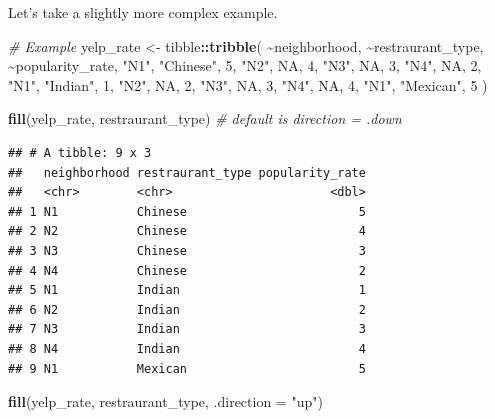 \documentclass[
]{book}
\newenvironment{Shaded}{\begin{snugshade}}{\end{snugshade}}
\newcommand{\AttributeTok}[1]{\textcolor[rgb]{0.13,0.29,0.53}{#1}}
\newcommand{\CommentTok}[1]{\textcolor[rgb]{0.56,0.35,0.01}{\textit{#1}}}
\newcommand{\ConstantTok}[1]{\textcolor[rgb]{0.56,0.35,0.01}{#1}}
\newcommand{\DecValTok}[1]{\textcolor[rgb]{0.00,0.00,0.81}{#1}}
\newcommand{\FunctionTok}[1]{\textcolor[rgb]{0.13,0.29,0.53}{\textbf{#1}}}
\newcommand{\NormalTok}[1]{#1}
\newcommand{\OtherTok}[1]{\textcolor[rgb]{0.56,0.35,0.01}{#1}}
\newcommand{\SpecialCharTok}[1]{\textcolor[rgb]{0.81,0.36,0.00}{\textbf{#1}}}
\newcommand{\StringTok}[1]{\textcolor[rgb]{0.31,0.60,0.02}{#1}}
\begin{document}
Let's take a slightly more complex example.

\begin{Shaded}
\begin{Highlighting}[]
\CommentTok{\# Example}
\NormalTok{yelp\_rate }\OtherTok{\textless{}{-}}\NormalTok{ tibble}\SpecialCharTok{::}\FunctionTok{tribble}\NormalTok{(}
  \SpecialCharTok{\textasciitilde{}}\NormalTok{neighborhood, }\SpecialCharTok{\textasciitilde{}}\NormalTok{restraurant\_type, }\SpecialCharTok{\textasciitilde{}}\NormalTok{popularity\_rate,}
  \StringTok{"N1"}\NormalTok{, }\StringTok{"Chinese"}\NormalTok{, }\DecValTok{5}\NormalTok{,}
  \StringTok{"N2"}\NormalTok{, }\ConstantTok{NA}\NormalTok{, }\DecValTok{4}\NormalTok{,}
  \StringTok{"N3"}\NormalTok{, }\ConstantTok{NA}\NormalTok{, }\DecValTok{3}\NormalTok{,}
  \StringTok{"N4"}\NormalTok{, }\ConstantTok{NA}\NormalTok{, }\DecValTok{2}\NormalTok{,}
  \StringTok{"N1"}\NormalTok{, }\StringTok{"Indian"}\NormalTok{, }\DecValTok{1}\NormalTok{,}
  \StringTok{"N2"}\NormalTok{, }\ConstantTok{NA}\NormalTok{, }\DecValTok{2}\NormalTok{,}
  \StringTok{"N3"}\NormalTok{, }\ConstantTok{NA}\NormalTok{, }\DecValTok{3}\NormalTok{,}
  \StringTok{"N4"}\NormalTok{, }\ConstantTok{NA}\NormalTok{, }\DecValTok{4}\NormalTok{,}
  \StringTok{"N1"}\NormalTok{, }\StringTok{"Mexican"}\NormalTok{, }\DecValTok{5}
\NormalTok{)}

\FunctionTok{fill}\NormalTok{(yelp\_rate, restraurant\_type) }\CommentTok{\# default is direction = .down}
\end{Highlighting}
\end{Shaded}

\begin{verbatim}
## # A tibble: 9 x 3
##   neighborhood restraurant_type popularity_rate
##   <chr>        <chr>                      <dbl>
## 1 N1           Chinese                        5
## 2 N2           Chinese                        4
## 3 N3           Chinese                        3
## 4 N4           Chinese                        2
## 5 N1           Indian                         1
## 6 N2           Indian                         2
## 7 N3           Indian                         3
## 8 N4           Indian                         4
## 9 N1           Mexican                        5
\end{verbatim}

\begin{Shaded}
\begin{Highlighting}[]
\FunctionTok{fill}\NormalTok{(yelp\_rate, restraurant\_type, }\AttributeTok{.direction =} \StringTok{"up"}\NormalTok{)}
\end{Highlighting}
\end{Shaded}
\end{document}
